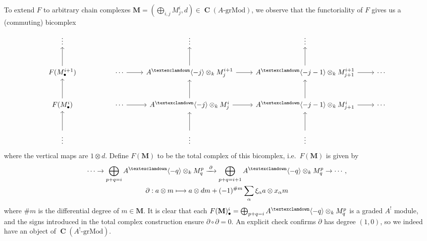 \documentclass[a4paper]{article}
\theoremstyle{definition}
\theoremstyle{remark}
\newcommand{\grMod}{\ensuremath{\text{-grMod}}}
\DeclareMathOperator{\Ch}{\mathbf{C}}
\newcommand{\gnab}{{\textexclamdown}}
\begin{document}
To extend \(F\) to arbitrary chain complexes \(\mathbf{M}=(\bigoplus_{i,j}M^i_j,
d)\in \Ch(A\grMod)\), we observe that the functoriality of \(F\) gives us a (commuting) bicomplex
\begin{equation}\label{FM-totcomp}
    \begin{tikzcd}[row sep=large]
    \vdots 
           &            
           & 
           & \vdots 
           & \vdots 
           & \\
    F(M^{i+1}_\bullet) \arrow[u]
           & 
           & \cdots \arrow[r]
           & A^\gnab \langle -j \rangle\otimes_k M^{i+1}_j \arrow[r] \arrow[u]
           & A^\gnab \langle -j-1 \rangle\otimes_k M^{i+1}_{j+1} \arrow[r] \arrow[u]
           & \cdots \\
    F(M^{i}_\bullet) \arrow[u]
           & 
           & \cdots \arrow[r]
           & A^\gnab \langle -j \rangle\otimes_k M^{i}_j  \arrow[r] \arrow[u]
           & A^\gnab\langle -j-1 \rangle\otimes_k M^{i}_{j+1}  \arrow[r] \arrow[u]
           & \cdots \\
    \vdots \arrow[u]
           &            
           & 
           & \vdots \arrow[u] 
           & \vdots \arrow[u]
           &   
    \end{tikzcd}
\end{equation}
where the vertical maps are \(1\otimes d\). Define
\(F(\mathbf{M})\) to be the total complex of this bicomplex, i.e.\
\(F(\mathbf{M})\) is given by
\begin{gather}
    \cdots \rightarrow \bigoplus_{p+q=i}A^\gnab\langle -q \rangle \otimes_k
    M^p_q \xrightarrow{\;\partial\;} \bigoplus_{p+q=i+1}A^\gnab\langle -q
    \rangle\otimes_k M^p_q \rightarrow \cdots, \label{F-def} \\
    \partial: a\otimes m \longmapsto a\otimes dm + (-1)^{\#m}\sum_\alpha
    \xi_\alpha a \otimes x_\alpha m \nonumber
\end{gather}
where \(\#m\) is the differential degree of \(m\in \mathbf{M}\). It is clear
that each \(F(\textbf{M})^i_\bullet = \bigoplus_{p+q=i}A^\gnab\langle -q\rangle
\otimes_k M^p_q\) is a graded \(A^!\) module, and the signs introduced in the
total complex construction ensure \(\partial \circ \partial = 0\). An explicit
check confirms \(\partial\) has degree \((1,0)\), so we indeed have an object of
\(\Ch(A^!\grMod)\).
\end{document}
